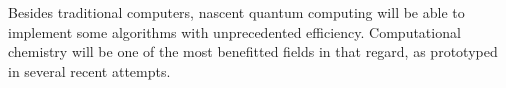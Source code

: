 Besides traditional computers, nascent quantum computing will be able to implement some algorithms with unprecedented efficiency. Computational chemistry will be one of the most benefitted fields in that regard,\cite{lanyon2010towards,zeng2017first,reiher2017elucidating} as prototyped in several recent attempts.\cite{hellweg2017brick,kandala2017hardware,sim2018quantum,dumitrescu2018cloud}











